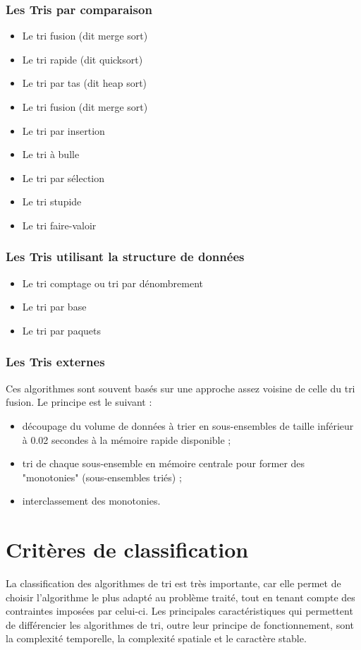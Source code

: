 \documentclass[11pt,a4paper]{article}
\begin{document}
\subsubsection{Les Tris par comparaison}
\begin{itemize}
    \item Le tri fusion (dit merge sort)
    \item Le tri rapide (dit quicksort)
    \item Le tri par tas (dit heap sort)
    \item Le tri fusion (dit merge sort)
    \item Le tri par insertion
    \item Le tri à bulle
    \item Le tri par sélection
    \item Le tri stupide
    \item Le tri faire-valoir
\end{itemize}
\newpage
\subsubsection{Les Tris utilisant la structure de données}
\begin{itemize}
    \item Le tri comptage ou tri par dénombrement
    \item Le tri par base
    \item Le tri par paquets
\end{itemize}

\subsubsection{Les Tris externes}
Ces algorithmes sont souvent basés sur une approche assez voisine de celle du tri fusion. Le principe est le suivant :
\vspace{0.2cm}

\begin{itemize}
    \item découpage du volume de données à trier en sous-ensembles de taille inférieur à 0.02 secondes  à la mémoire rapide disponible ;
    \item tri de chaque sous-ensemble en mémoire centrale pour former des "monotonies" (sous-ensembles triés) ;
    \item interclassement des monotonies.
\end{itemize}

\section{Critères de classification}
La classification des algorithmes de tri est très importante, car elle permet de choisir l’algorithme le plus adapté au problème traité,
tout en tenant compte des contraintes imposées par celui-ci. Les principales caractéristiques qui permettent de différencier les algorithmes
de tri, outre leur principe de fonctionnement, sont la complexité temporelle, la complexité spatiale et le caractère stable.
\end{document}
